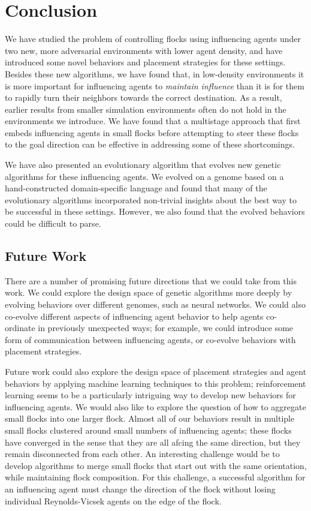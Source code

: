 \chapter{Conclusion}
\label{ch:conclusion}

We have studied the problem of controlling flocks using influencing agents
under two new, more adversarial environments with lower agent density, and
have introduced some novel behaviors and placement strategies for these
settings.
Besides these new algorithms, we have found that, in low-density
environments it is more important for influencing agents to
\textit{maintain influence} than it is for them to rapidly turn their
neighbors towards the correct destination.
As a result, earlier results from smaller simulation environments often do
not hold in the environments we introduce.
We have found that a multistage approach that first embeds influencing
agents in small flocks before attempting to steer these flocks to the goal
direction can be effective in addressing some of these shortcomings.

We have also presented an evolutionary algorithm that evolves new genetic
algorithms for these influencing agents.
We evolved on a genome based on a hand-constructed domain-specific language
and found that many of the evolutionary algorithms incorporated non-trivial
insights about the best way to be successful in these settings.
However, we also found that the evolved behaviors could be difficult to parse.

\section*{Future Work}
There are a number of promising future directions that we could take from this
work.
We could explore the design space of genetic algorithms more deeply by
evolving behaviors over different genomes, such as neural networks.
We could also co-evolve different aspects of influencing agent behavior to help
agents co-ordinate in previously unexpected ways; for example, we could
introduce some form of communication between influencing agents, or co-evolve
behaviors with placement strategies.

Future work could also explore the design space of placement strategies and
agent behaviors by applying machine learning techniques to this problem;
reinforcement learning seems to be a particularly intriguing way to develop new
behaviors for influencing agents.
We would also like to explore the question of how to aggregate small flocks
into one larger flock.
Almost all of our behaviors result in multiple small flocks clustered around
small numbers of influencing agents; these flocks have converged in the sense
that they are all afcing the same direction, but they remain disconnected from
each other.
An interesting challenge would be to develop algorithms to merge small flocks
that start out with the same orientation, while maintaining flock composition.
For this challenge, a successful algorithm for an influencing agent must change
the direction of the flock without losing individual Reynolds-Vicsek agents on
the edge of the flock.

